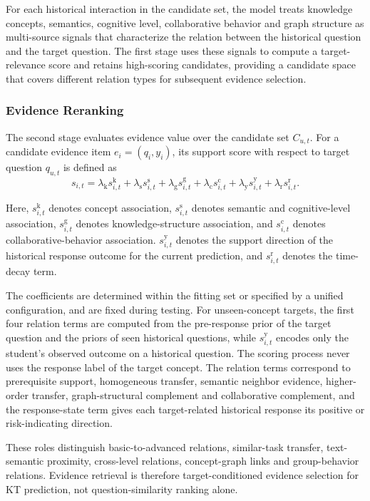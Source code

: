 \documentclass[a4paper,12pt]{article}
\numberwithin{table}{section}
\begin{document}
For each historical interaction in the candidate set, the model treats knowledge concepts, semantics, cognitive level, collaborative behavior and graph structure as multi-source signals that characterize the relation between the historical question and the target question. The first stage uses these signals to compute a target-relevance score and retains high-scoring candidates, providing a candidate space that covers different relation types for subsequent evidence selection.

\subsubsection{Evidence Reranking}

The second stage evaluates evidence value over the candidate set \(C_{u,t}\). For a candidate evidence item \(e_i=(q_i,y_i)\), its support score with respect to target question \(q_{u,t}\) is defined as
\[
s_{i,t}=\lambda_{\mathrm{k}}s^{\mathrm{k}}_{i,t}+\lambda_{\mathrm{s}}s^{\mathrm{s}}_{i,t}+\lambda_{\mathrm{g}}s^{\mathrm{g}}_{i,t}+\lambda_{\mathrm{c}}s^{\mathrm{c}}_{i,t}+\lambda_{\mathrm{y}}s^{\mathrm{y}}_{i,t}+\lambda_{\mathrm{r}}s^{\mathrm{r}}_{i,t}.
\]

Here, \(s^{\mathrm{k}}_{i,t}\) denotes concept association, \(s^{\mathrm{s}}_{i,t}\) denotes semantic and cognitive-level association, \(s^{\mathrm{g}}_{i,t}\) denotes knowledge-structure association, and \(s^{\mathrm{c}}_{i,t}\) denotes collaborative-behavior association. \(s^{\mathrm{y}}_{i,t}\) denotes the support direction of the historical response outcome for the current prediction, and \(s^{\mathrm{r}}_{i,t}\) denotes the time-decay term.

The coefficients are determined within the fitting set or specified by a unified configuration, and are fixed during testing. For unseen-concept targets, the first four relation terms are computed from the pre-response prior of the target question and the priors of seen historical questions, while \(s^{\mathrm{y}}_{i,t}\) encodes only the student's observed outcome on a historical question. The scoring process never uses the response label of the target concept. The relation terms correspond to prerequisite support, homogeneous transfer, semantic neighbor evidence, higher-order transfer, graph-structural complement and collaborative complement, and the response-state term gives each target-related historical response its positive or risk-indicating direction.

These roles distinguish basic-to-advanced relations, similar-task transfer, text-semantic proximity, cross-level relations, concept-graph links and group-behavior relations. Evidence retrieval is therefore target-conditioned evidence selection for KT prediction, not question-similarity ranking alone.
\end{document}
